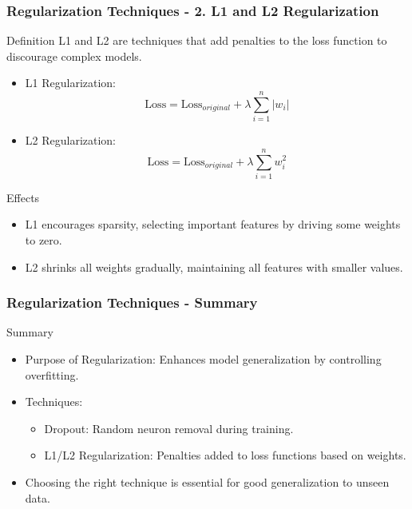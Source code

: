 \documentclass[aspectratio=169]{beamer}
\begin{document}
\begin{frame}[fragile]
    \frametitle{Regularization Techniques - 2. L1 and L2 Regularization}
    \begin{block}{Definition}
        L1 and L2 are techniques that add penalties to the loss function to discourage complex models.
    \end{block}
    \begin{itemize}
        \item L1 Regularization:
        \begin{equation}
            \text{Loss} = \text{Loss}_{original} + \lambda \sum_{i=1}^{n} |w_i|
        \end{equation}
        \item L2 Regularization:
        \begin{equation}
            \text{Loss} = \text{Loss}_{original} + \lambda \sum_{i=1}^{n} w_i^2
        \end{equation}
    \end{itemize}
    \begin{block}{Effects}
        \begin{itemize}
            \item L1 encourages sparsity, selecting important features by driving some weights to zero.
            \item L2 shrinks all weights gradually, maintaining all features with smaller values.
        \end{itemize}
    \end{block}
\end{frame}

\begin{frame}[fragile]
    \frametitle{Regularization Techniques - Summary}
    \begin{block}{Summary}
        \begin{itemize}
            \item Purpose of Regularization: Enhances model generalization by controlling overfitting.
            \item Techniques:
            \begin{itemize}
                \item Dropout: Random neuron removal during training.
                \item L1/L2 Regularization: Penalties added to loss functions based on weights.
            \end{itemize}
            \item Choosing the right technique is essential for good generalization to unseen data.
        \end{itemize}
    \end{block}
\end{frame}
\end{document}
